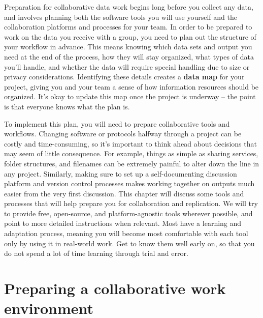 
\begin{fullwidth}
Preparation for collaborative data work begins long before you collect any data,
and involves planning both the software tools you will use yourself
and the collaboration platforms and processes for your team.
In order to be prepared to work on the data you receive with a group,
you need to plan out the structure of your workflow in advance.
This means knowing which data sets and output you need at the end of the process,
how they will stay organized, what types of data you'll handle,
and whether the data will require special handling due to size or privacy considerations.
Identifying these details creates a \textbf{data map} for your project,
giving you and your team a sense of how information resources should be organized.
It's okay to update this map once the project is underway --
the point is that everyone knows what the plan is.

To implement this plan, you will need to prepare collaborative tools and workflows.
Changing software or protocols halfway through a project can be costly and time-consuming,
so it's important to think ahead about decisions that may seem of little consequence.
For example, things as simple as sharing services, folder structures, and filenames
can be extremely painful to alter down the line in any project.
Similarly, making sure to set up a self-documenting discussion platform
and version control processes
makes working together on outputs much easier from the very first discussion.
This chapter will discuss some tools and processes that
will help prepare you for collaboration and replication.
We will try to provide free, open-source, and platform-agnostic tools wherever possible,
and point to more detailed instructions when relevant.
Most have a learning and adaptation process,
meaning you will become most comfortable with each tool
only by using it in real-world work.
Get to know them well early on,
so that you do not spend a lot of time learning through trial and error.
\end{fullwidth}


\section{Preparing a collaborative work environment}

